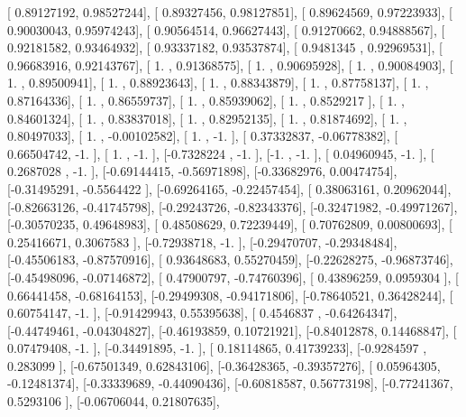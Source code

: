 \documentclass{article}
\begin{document}
       [ 0.89127192,  0.98527244],
       [ 0.89327456,  0.98127851],
       [ 0.89624569,  0.97223933],
       [ 0.90030043,  0.95974243],
       [ 0.90564514,  0.96627443],
       [ 0.91270662,  0.94888567],
       [ 0.92181582,  0.93464932],
       [ 0.93337182,  0.93537874],
       [ 0.9481345 ,  0.92969531],
       [ 0.96683916,  0.92143767],
       [ 1.        ,  0.91368575],
       [ 1.        ,  0.90695928],
       [ 1.        ,  0.90084903],
       [ 1.        ,  0.89500941],
       [ 1.        ,  0.88923643],
       [ 1.        ,  0.88343879],
       [ 1.        ,  0.87758137],
       [ 1.        ,  0.87164336],
       [ 1.        ,  0.86559737],
       [ 1.        ,  0.85939062],
       [ 1.        ,  0.8529217 ],
       [ 1.        ,  0.84601324],
       [ 1.        ,  0.83837018],
       [ 1.        ,  0.82952135],
       [ 1.        ,  0.81874692],
       [ 1.        ,  0.80497033],
       [ 1.        , -0.00102582],
       [ 1.        , -1.        ],
       [ 0.37332837, -0.06778382],
       [ 0.66504742, -1.        ],
       [ 1.        , -1.        ],
       [-0.7328224 , -1.        ],
       [-1.        , -1.        ],
       [ 0.04960945, -1.        ],
       [ 0.2687028 , -1.        ],
       [-0.69144415, -0.56971898],
       [-0.33682976,  0.00474754],
       [-0.31495291, -0.5564422 ],
       [-0.69264165, -0.22457454],
       [ 0.38063161,  0.20962044],
       [-0.82663126, -0.41745798],
       [-0.29243726, -0.82343376],
       [-0.32471982, -0.49971267],
       [-0.30570235,  0.49648983],
       [ 0.48508629,  0.72239449],
       [ 0.70762809,  0.00800693],
       [ 0.25416671,  0.3067583 ],
       [-0.72938718, -1.        ],
       [-0.29470707, -0.29348484],
       [-0.45506183, -0.87570916],
       [ 0.93648683,  0.55270459],
       [-0.22628275, -0.96873746],
       [-0.45498096, -0.07146872],
       [ 0.47900797, -0.74760396],
       [ 0.43896259,  0.0959304 ],
       [ 0.66441458, -0.68164153],
       [-0.29499308, -0.94171806],
       [-0.78640521,  0.36428244],
       [ 0.60754147, -1.        ],
       [-0.91429943,  0.55395638],
       [ 0.4546837 , -0.64264347],
       [-0.44749461, -0.04304827],
       [-0.46193859,  0.10721921],
       [-0.84012878,  0.14468847],
       [ 0.07479408, -1.        ],
       [-0.34491895, -1.        ],
       [ 0.18114865,  0.41739233],
       [-0.9284597 ,  0.283099  ],
       [-0.67501349,  0.62843106],
       [-0.36428365, -0.39357276],
       [ 0.05964305, -0.12481374],
       [-0.33339689, -0.44090436],
       [-0.60818587,  0.56773198],
       [-0.77241367,  0.5293106 ],
       [-0.06706044,  0.21807635],
\end{document}
